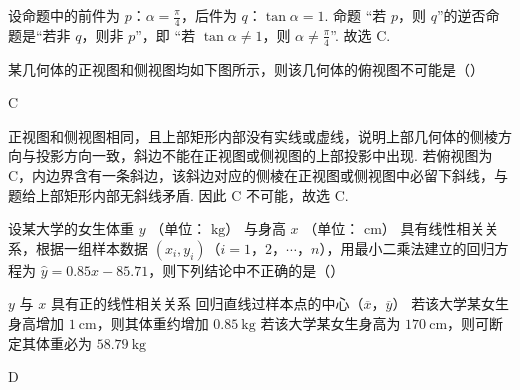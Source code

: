 \begin{solution}
设命题中的前件为 \(p\)：\(\alpha=\frac{\pi}{4}\)，后件为 \(q\)：\(\tan\alpha=1\). 命题
“若 \(p\)，则 \(q\)”的逆否命题是“若非 \(q\)，则非 \(p\)”，即
“若 \(\tan\alpha\neq1\)，则 \(\alpha\neq\frac{\pi}{4}\)”. 故选 C.
\end{solution}

\begin{problem}
某几何体的正视图和侧视图均如下图所示，则该几何体的俯视图不可能是（\quad）


    {}
    {}
    {}
\end{problem}

\begin{answer}
C
\end{answer}

\begin{solution}
正视图和侧视图相同，且上部矩形内部没有实线或虚线，说明上部几何体的侧棱方向与投影方向一致，斜边不能在正视图或侧视图的上部投影中出现. 若俯视图为 C，内边界含有一条斜边，该斜边对应的侧棱在正视图或侧视图中必留下斜线，与题给上部矩形内部无斜线矛盾. 因此 C 不可能，故选 C.
\end{solution}

\begin{problem}
设某大学的女生体重 \( y \) （单位： \( \mathrm{kg} \)） 与身高 \( x \) （单位： \( \mathrm{cm} \)） 具有线性相关关系，根据一组样本数据 \((x_i, y_i)\)（\(i = 1\)，\(2\)，\(\cdots\)，\(n\)），用最小二乘法建立的回归方程为 \( \hat{y} = 0.85x - 85.71 \)，则下列结论中不正确的是（\quad）

\choices
    {\(y\) 与 \(x\) 具有正的线性相关关系}
    {回归直线过样本点的中心（\(\overline{x}\)，\(\overline{y}\)）}
    {若该大学某女生身高增加 \(1 \mathrm{~cm}\)，则其体重约增加 \(0.85 \mathrm{~kg}\)}
    {若该大学某女生身高为 \(170 \mathrm{~cm}\)，则可断定其体重必为 \(58.79 \mathrm{~kg}\)}
\end{problem}

\begin{answer}
D
\end{answer}

